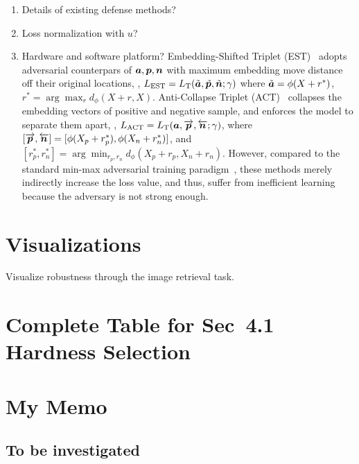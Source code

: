 \begin{enumerate}[noitemsep, label={Q.{\arabic*}}]
	\item Details of existing defense methods?

	\item Loss normalization with $u$?

	\item Hardware and software platform?
%
Embedding-Shifted Triplet (EST)~\cite{advrank} adopts adversarial counterpars
of ${\bm{a}},{\bm{p}},{\bm{n}}$ with maximum embedding move distance off their original
locations, \ie,
$L_\text{EST}=L_\text{T}(\tilde{{\bm{a}}},\tilde{{\bm{p}}},\tilde{{\bm{n}}};\gamma)$ where
$\tilde{{\bm{a}}}=\phi(X+r^*)$, $r^*=\arg\max_{r}d_\phi(X+r, X)$.
%
Anti-Collapse Triplet (ACT)~\cite{robrank} collapses the embedding vectors of
positive and negative sample, and enforces the model to separate them apart,
\ie, $L_\text{ACT}=L_\text{T}({\bm{a}}, \overrightarrow{{\bm{p}}},
\overleftarrow{{\bm{n}}};\gamma)$, where $[\overrightarrow{{\bm{p}}},\overleftarrow{{\bm{n}}}]
=[\phi(X_p+r_p^*), \phi(X_n+r_n^*)]$, and $[r_p^*,r_n^*]=\arg\min_{r_p,r_n}
d_\phi(X_p+r_p, X_n+r_n)$.
%
However, compared to the standard min-max adversarial training
paradigm~\cite{madry}, these methods merely indirectly increase the loss value,
and thus, suffer from inefficient learning because the adversary is not strong
enough.


\end{enumerate}



\section{Visualizations}

Visualize robustness through the image retrieval task.

\section{Complete Table for Sec~4.1 Hardness Selection}

\section{My Memo}

\subsection{To be investigated}

